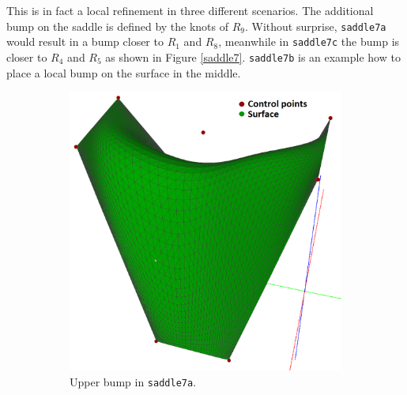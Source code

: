 \documentclass{article}
\begin{document}
This is in fact a local refinement in three different scenarios. The additional bump on the saddle is defined by the knots of $R_9$. Without surprise, \texttt{saddle7a} would result in a bump closer to $R_1$ and $R_8$, meanwhile in \texttt{saddle7c} the bump is closer to $R_4$ and $R_5$ as shown in Figure \ref{saddle7}. \texttt{saddle7b} is an example how to place a local bump on the surface in the middle.

\begin{figure}[H]
\centering
\begin{subfigure}[b]{0.32\textwidth}
\includegraphics[width=\textwidth]{saddle7a}
\caption{Upper bump in \texttt{saddle7a}.}
\label{saddle7a}
\end{subfigure}
\begin{subfigure}[b]{0.32\textwidth}

\end{subfigure}
\end{figure}
\end{document}
